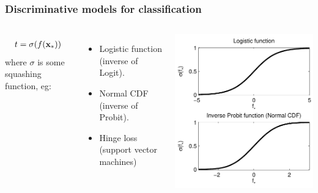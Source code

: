 \begin{frame}
\frametitle{Discriminative models for classification}
\begin{columns}[c]
\begin{align*}
t = \sigma(f({\bf x}_*)) 
\end{align*}
where $\sigma$ is some squashing function, eg:
\begin{itemize}
\item Logistic function (inverse of Logit).
\item Normal CDF (inverse of Probit).
\item Hinge loss (support vector machines)
\end{itemize}
\includegraphics[width=.75\textwidth]{squashing}


\end{columns}
\end{frame}

